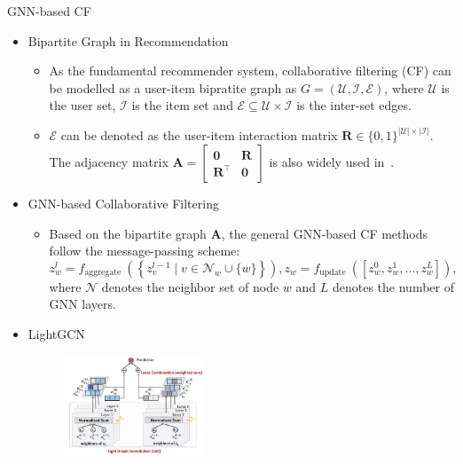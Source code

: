 \documentclass[t]{beamer}
\begin{document}
\begin{frame}[allowframebreaks]{GNN-based CF}
\setlistsep{1ex}{0ex}{0ex}
\begin{itemize}
    \item Bipartite Graph in Recommendation
    \begin{itemize}
        \item  As the fundamental recommender system, collaborative filtering (CF) can be modelled as a user-item bipratite graph as $G = (\mathcal{U}, \mathcal{I}, \mathcal{E})$, where $\mathcal{U}$ is the user set, $\mathcal{I}$ is the item set and $\mathcal{E} \subseteq \mathcal{U} \times \mathcal{I}$ is the  inter-set edges. 
        \item $\mathcal{E}$ can be denoted as the user-item interaction matrix $\mathbf{R}\in \{0, 1\}^{|\mathcal{U}| \times |\mathcal{I}|}$.
The adjacency matrix
$
\mathbf{A}=\left[\begin{array}{cc}
\mathbf{0} & \mathbf{R} \\
\mathbf{R}^{\top} & \mathbf{0}
\end{array}\right]
$
is also widely used in~\cite{he2020lightgcn}.

    \end{itemize}

   \item GNN-based Collaborative Filtering
   \begin{itemize}
       \item Based on the bipartite graph $\mathbf{A}$, the general GNN-based CF methods follow the message-passing scheme:
\begin{equation*}
z_{w}^{l} =f_{\text {aggregate }}\left(\left\{z_{v}^{l-1} \mid v \in \mathcal{N}_{w} \cup\{w\}\right\}\right), 
z_{w} =f_{\text {update }}\left(\left[z_{w}^{0}, z_{w}^{1}, \ldots, z_{w}^{L}\right]\right),
\end{equation*}
where $\mathcal{N}$ denotes the neighbor set of node $w$ and $L$ denotes the number of GNN layers. 
    \end{itemize}
\framebreak
    \item LightGCN
    \begin{figure}
        \centering
        \includegraphics[width=0.4\textwidth]{images/lightgcn.jpg}
        \label{fig:my_label}
    \end{figure}


\end{itemize}
\end{frame}
\end{document}
